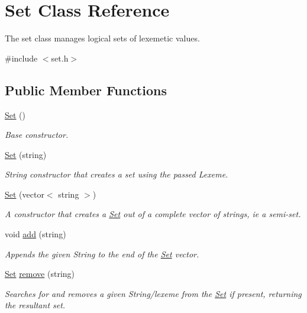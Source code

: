 \hypertarget{classSet}{
\section{Set Class Reference}
\label{classSet}
}


The set class manages logical sets of lexemetic values.  




{\ttfamily \#include $<$set.h$>$}

\subsection*{Public Member Functions}
\begin{DoxyCompactItemize}
\item 
\hyperlink{classSet_a1c5d4bec6a962eb5805cf9a7321e241d}{Set} ()
\begin{DoxyCompactList}\small\item\em Base constructor. \item\end{DoxyCompactList}\item 
\hyperlink{classSet_a6391cf8d2fcee12b6163ebc652f57d1e}{Set} (string)
\begin{DoxyCompactList}\small\item\em String constructor that creates a set using the passed Lexeme. \item\end{DoxyCompactList}\item 
\hyperlink{classSet_a9208c95d5e0d0fcbec93ebc9697d2d8a}{Set} (vector$<$ string $>$)
\begin{DoxyCompactList}\small\item\em A constructor that creates a \hyperlink{classSet}{Set} out of a complete vector of strings, ie a semi-\/set. \item\end{DoxyCompactList}\item 
void \hyperlink{classSet_a7b7abf085543d6416445543d9ecec250}{add} (string)
\begin{DoxyCompactList}\small\item\em Appends the given String to the end of the \hyperlink{classSet}{Set} vector. \item\end{DoxyCompactList}\item 
\hyperlink{classSet}{Set} \hyperlink{classSet_aff1a2ae6ae0f3bc950b4dba2e46c645f}{remove} (string)
\begin{DoxyCompactList}\small\item\em Searches for and removes a given String/lexeme from the \hyperlink{classSet}{Set} if present, returning the resultant set. \item\end{DoxyCompactList}\item 

\end{DoxyCompactItemize}
